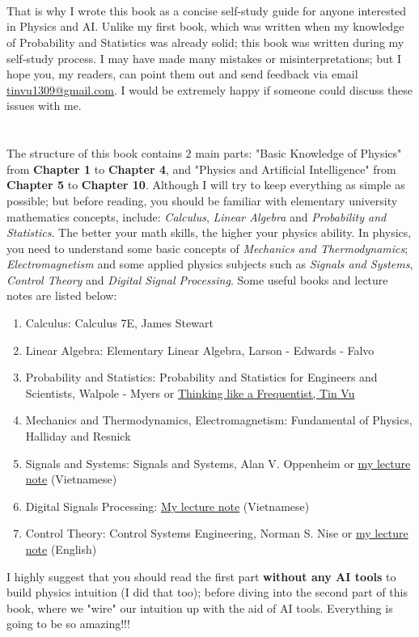 \documentclass[phyai.tex]{subfiles}
\begin{document}
\\ \\ \\ \indent That is why I wrote this book as a concise self-study guide for anyone interested in Physics and AI. Unlike my first book, which was written when my knowledge of Probability and Statistics was already solid; this book was written during my self-study process. I may have made many mistakes or misinterpretations; but I hope you, my readers, can point them out and send feedback via email \url{tinvu1309@gmail.com}. I would be extremely happy if someone could discuss these issues with me.
\\ \\ \\ \indent The structure of this book contains $2$ main parts: "Basic Knowledge of Physics" from \textbf{Chapter 1} to \textbf{Chapter 4}, and "Physics and Artificial Intelligence" from \textbf{Chapter 5} to \textbf{Chapter 10}. Although I will try to keep everything as simple as possible; but before reading, you should be familiar with elementary university mathematics concepts, include: \textit{Calculus}, \textit{Linear Algebra} and \textit{Probability and Statistics}. The better your math skills, the higher your physics ability. In physics, you need to understand some basic concepts of \textit{Mechanics and Thermodynamics}; \textit{Electromagnetism} and some applied physics subjects such as \textit{Signals and Systems}, \textit{Control Theory} and \textit{Digital Signal Processing}. Some useful books and lecture notes are listed below:
\begin{enumerate}
	\item Calculus: Calculus 7E, James Stewart
	\item Linear Algebra: Elementary Linear Algebra, Larson - Edwards - Falvo
	\item Probability and Statistics: Probability and Statistics for Engineers and Scientists, Walpole - Myers or \href{https://www.dropbox.com/scl/fo/v6avajcywzf396ijva68s/AClNG47__ZziHChSFUN3FM0?rlkey=a9nk07e97hk29rbizrxpjkv9p&st=ixe6q0bu&dl=0}{Thinking like a Frequentist, Tin Vu}
	\item Mechanics and Thermodynamics, Electromagnetism: Fundamental of Physics, Halliday and Resnick
	\item Signals and Systems: Signals and Systems, Alan V. Oppenheim or \href{https://www.dropbox.com/scl/fo/tlh3tzy4d0ejnk4x6qnvm/AKUyFEJCCTc-tMq0AdVXvNo?rlkey=2osp3r8rhxjsya24lwi3xb90y&st=e6f4pntj&dl=0}{my lecture note} (Vietnamese)
	\item Digital Signals Processing: \href{https://www.dropbox.com/scl/fo/5eu66idzer3iyrulvp3xq/AHpBr6XP5q98s3l-PsMr_C0?rlkey=q6dci4iatdnyhq8z09u05x62d&st=j2e3ur8e&dl=0}{My lecture note} (Vietnamese)
	\item Control Theory: Control Systems Engineering, Norman S. Nise or \href{https://www.dropbox.com/scl/fo/64u9vd266rvsgfhpyqm1k/AD9BAXfevdA35OOMrNZLs9c?rlkey=yd5vhhycxugzlbklam8rvixda&st=0gqgl8am&dl=0}{my lecture note} (English)
\end{enumerate}
I highly suggest that you should read the first part \textbf{without any AI tools} to build physics intuition (I did that too); before diving into the second part of this book, where we "wire" our intuition up with the aid of AI tools. Everything is going to be so amazing!!!
\end{document}
